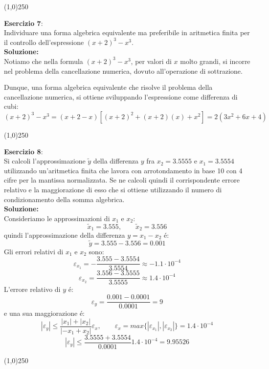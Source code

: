 \begin{center}
\line(1,0){250}
\end{center}

\textbf{Esercizio 7}:\\Individuare una forma algebrica equivalente ma
preferibile in aritmetica finita per il controllo dell'espressione
$(x+2)^3-x^3$.\\

\textbf{Soluzione:}\\Notiamo che nella formula $(x+2)^3-x^3$, per valori di $x$
molto grandi, si incorre nel problema della cancellazione numerica, dovuto
all'operazione di sottrazione.

Dunque, una forma algebrica equivalente che risolve il problema della
cancellazione numerica, si ottiene sviluppando l'espressione come differenza di
cubi: $$(x+2)^3-x^3 = (x+2-x)[(x+2)^2+(x+2)(x)+x^2] = 2(3x^2+6x +4)$$

\begin{center}
\line(1,0){250}
\end{center}

\textbf{Esercizio 8}:\\Si calcoli l'approssimazione $\tilde{y}$ della
differenza $y$ fra $x_2 = 3.5555$ e $x_1 = 3.5554$ utilizzando un'aritmetica finita che
lavora con arrotondamento in base 10 con 4 cifre per la mantissa normalizzata.
Se ne calcoli quindi il corrispondente errore relativo e la maggiorazione di
esso che si ottiene utilizzando il numero di condizionamento della somma
algebrica.\\

\textbf{Soluzione:}\\Consideriamo le approssimazioni di $x_1$ e $x_2$:
$$\tilde{x}_1 = 3.555,\qquad\tilde{x}_2 = 3.556$$
quindi l'approssimazione della differenza $y = x_1-x_2$ \'e:
$$\tilde{y} = 3.555-3.556 = 0.001$$ 
Gli errori relativi di $x_1$ e $x_2$ sono:
$$\varepsilon_{x_1} = -\frac{3.555 - 3.5554}{3.5554} \approx -1.1\cdot10^{-4}$$
$$\varepsilon_{x_2} = \frac{3.556 - 3.5555}{3.5555} \approx 1.4\cdot10^{-4}$$
L'errore relativo di $y$ \'e:
$$\varepsilon_y = \frac{0.001 - 0.0001}{0.0001} = 9$$
e una sua maggiorazione \'e:
$$|\varepsilon_y| \leq \frac{|x_1|+|x_2|}{|-x_1 + x_2|}\varepsilon_x,\qquad 
\varepsilon_x = max\{|\varepsilon_{x_1}|,|\varepsilon_{x_2}|\} =
1.4\cdot10^{-4}$$ $$|\varepsilon_y| \leq \frac{3.5555 + 3.5554}{0.0001}1.4\cdot10^{-4} =
9.95526$$

\begin{center}
\line(1,0){250}
\end{center}

